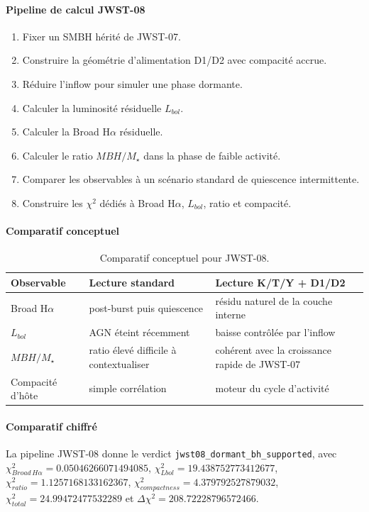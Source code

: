 \documentclass[11pt,a4paper]{article}
\begin{document}
\paragraph{Pipeline de calcul JWST-08}
\begin{enumerate}[leftmargin=*,itemsep=0.2em,topsep=0.2em]
\item Fixer un SMBH hérité de JWST-07.
\item Construire la géométrie d'alimentation D1/D2 avec compacité accrue.
\item Réduire l'inflow pour simuler une phase dormante.
\item Calculer la luminosité résiduelle $L_{bol}$.
\item Calculer la Broad H$\alpha$ résiduelle.
\item Calculer le ratio $MBH/M_\star$ dans la phase de faible activité.
\item Comparer les observables à un scénario standard de quiescence intermittente.
\item Construire les $\chi^2$ dédiés à Broad H$\alpha$, $L_{bol}$, ratio et compacité.
\end{enumerate}

\paragraph{Comparatif conceptuel}
\begin{table}[htbp]
\centering
\begin{tabular}{>{\raggedright\arraybackslash}p{4cm} >{\raggedright\arraybackslash}p{5.2cm} >{\raggedright\arraybackslash}p{5.2cm}}
\toprule
Observable & Lecture standard & Lecture K/T/Y + D1/D2 \\
\midrule
Broad H$\alpha$ & post-burst puis quiescence & résidu naturel de la couche interne \\
$L_{bol}$ & AGN éteint récemment & baisse contrôlée par l'inflow \\
$MBH/M_\star$ & ratio élevé difficile à contextualiser & cohérent avec la croissance rapide de JWST-07 \\
Compacité d'hôte & simple corrélation & moteur du cycle d'activité \\
\bottomrule
\end{tabular}
\caption{Comparatif conceptuel pour JWST-08.}
\end{table}

\paragraph{Comparatif chiffré}
La pipeline JWST-08 donne le verdict \texttt{jwst08\_dormant\_bh\_supported}, avec $\chi^2_{Broad\,H\alpha}=0.05046266071494085$, $\chi^2_{Lbol}=19.438752773412677$, $\chi^2_{ratio}=1.1257168133162367$, $\chi^2_{compactness}=4.379792527879032$, $\chi^2_{total}=24.99472477532289$ et $\Delta\chi^2=208.72228796572466$.
\end{document}
